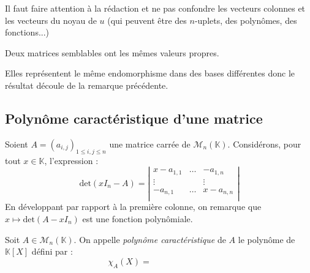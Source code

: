 \documentclass[a4paper,10pt]{report}
\begin{document}
\medskip

\begin{att} Il faut faire attention à la rédaction et ne pas confondre les vecteurs colonnes et les vecteurs du noyau de $u$ (qui peuvent être des $n$-uplets, des polynômes, des fonctions...)
\end{att}

\medskip


\begin{prop} Deux matrices semblables ont les mêmes valeurs propres.
\end{prop}

\begin{preuve} Elles représentent le même endomorphisme dans des bases différentes donc le résultat découle de la remarque précédente.
\end{preuve}


\subsection{Polynôme caractéristique d'une matrice}

\noindent Soient $A = (a_{i,j})_{1 \leq i,j \leq n}$ une matrice carrée de $\mathcal{M}_n(\mathbb{K})$. Considérons, pour tout $x \in \mathbb{K}$, l'expression :
$$ \textrm{det}(x I_n-A) = \left\vert \begin{array}{ccc}
x-a_{1,1} & \ldots & -a_{1,n} \\
\vdots & & \vdots \\
-a_{n,1} & \ldots & x-a_{n,n} \\
\end{array}\right\vert$$
En développant par rapport à la première colonne, on remarque que $x \mapsto \textrm{det}(A-x I_n)$ est une fonction polynômiale.

\begin{defin} Soit $A \in \mathcal{M}_n(\mathbb{K})$. On appelle \textit{polynôme caractéristique} de $A$ le polynôme de $\mathbb{K}[X]$ défini par :
$$ \chi_A(X) = \phantom{\textrm{det}(X I_n-A)}$$
\end{defin}
\end{document}

